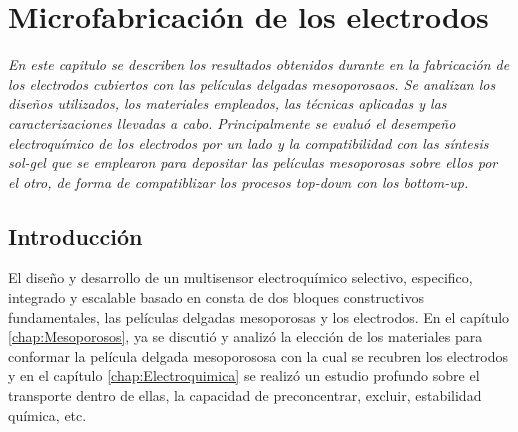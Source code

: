  \newcommand{\NoBiblioMicro}[1]{
 \ifthenelse{\equal{#1}{verdadero}}{}{}
 \NoBiblioMicro{verdadero}}

 
 \FormatoCapituloDosLineas
 
 \chapter{Microfabricación de los electrodos}\label{chap:Microfabricacion}

 \thispagestyle{empty}
	
 \noindent\textit{En este capitulo se describen los resultados obtenidos durante en la fabricación de los electrodos cubiertos con las películas delgadas mesoporosaos. Se analizan los diseños utilizados, los materiales empleados, las técnicas aplicadas y las caracterizaciones llevadas a cabo. Principalmente se evaluó el desempeño electroquímico de los electrodos por un lado y la compatibilidad con las síntesis sol-gel que se emplearon para depositar las películas mesoporosas sobre ellos por el otro, de forma de compatiblizar los procesos \textit{top-down} con los \textit{bottom-up}.}
 
 
 \vfill
 \minitoc
 \newpage

\section{Introducción}
	
	El diseño y desarrollo de un multisensor electroquímico selectivo, especifico, integrado y escalable basado en \pdm\space consta de dos bloques constructivos fundamentales, las películas delgadas mesoporosas y los electrodos. En el capítulo \ref{chap:Mesoporosos}, ya se discutió y analizó la elección de los materiales para conformar la película delgada mesoporososa con la cual se recubren los electrodos y en el capítulo \ref{chap:Electroquimica} se realizó un estudio profundo sobre el transporte dentro de ellas, la capacidad de preconcentrar, excluir, estabilidad química, etc.

